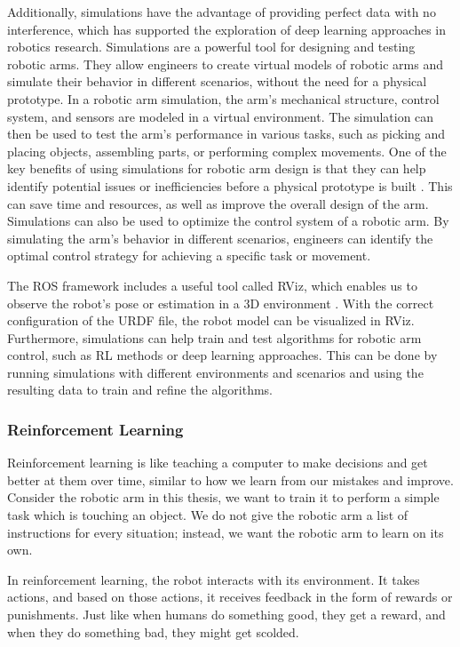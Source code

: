 \documentclass[12pt,oneside]{article}
\begin{document}
Additionally, simulations have the advantage of providing perfect data with no interference, which has supported the exploration of deep learning approaches in robotics research.
Simulations are a powerful tool for designing and testing robotic arms. They allow engineers to create virtual models of robotic arms and simulate their behavior in different scenarios, without the need for a physical prototype. In a robotic arm simulation, the arm's mechanical structure, control system, and sensors are modeled in a virtual environment. The simulation can then be used to test the arm's performance in various tasks, such as picking and placing objects, assembling parts, or performing complex movements. One of the key benefits of using simulations for robotic arm design is that they can help identify potential issues or inefficiencies before a physical prototype is built \cite{22_browning2001applying}. This can save time and resources, as well as improve the overall design of the arm. Simulations can also be used to optimize the control system of a robotic arm. By simulating the arm's behavior in different scenarios, engineers can identify the optimal control strategy for achieving a specific task or movement. 

The ROS framework includes a useful tool called RViz, which enables us to observe the robot's pose or estimation in a 3D environment \cite{23_kulkarni2021visual}. With the correct configuration of the URDF file, the robot model can be visualized in RViz.  Furthermore, simulations can help train and test algorithms for robotic arm control, such as RL methods or deep learning approaches. This can be done by running simulations with different environments and scenarios and using the resulting data to train and refine the algorithms.

\subsubsection{Reinforcement Learning}
Reinforcement learning is like teaching a computer to make decisions and get better at them over time, similar to how we learn from our mistakes and improve. Consider the robotic arm in this thesis, we want to train it to perform a simple task which is touching an object. We do not give the robotic arm a list of instructions for every situation; instead, we want the robotic arm to learn on its own.

In reinforcement learning, the robot interacts with its environment. It takes actions, and based on those actions, it receives feedback in the form of rewards or punishments. Just like when humans do something good, they get a reward, and when they do something bad, they might get scolded.
\end{document}
